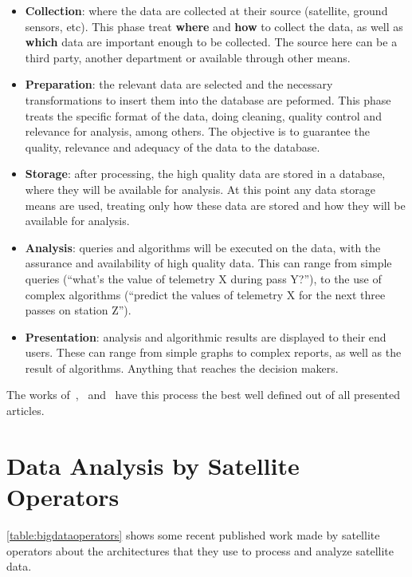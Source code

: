 \begin{itemize}[noitemsep]
  \item \textbf{Collection}: where the data are collected at their source (satellite, ground sensors, etc).
    This phase treat \textbf{where} and \textbf{how} to collect the data, as well as \textbf{which} data are important enough to be collected.
    The source here can be a third party, another department or available through other means.
  \item \textbf{Preparation}: the relevant data are selected and the necessary transformations to insert them into the database are peformed.
    This phase treats the specific format of the data, doing cleaning, quality control and relevance for analysis, among others.
    The objective is to guarantee the quality, relevance and adequacy of the data to the database.
  \item \textbf{Storage}: after processing, the high quality data are stored in a database, where they will be available for analysis.
    At this point any data storage means are used, treating only how these data are stored and how they will be available for analysis.
  \item \textbf{Analysis}: queries and algorithms will be executed on the data, with the assurance and availability of high quality data.
    This can range from simple queries (``what's the value of telemetry X during pass Y?''), to the use of complex algorithms (``predict the values of telemetry X for the next three passes on station Z'').
  \item \textbf{Presentation}: analysis and algorithmic results are displayed to their end users.
    These can range from simple graphs to complex reports, as well as the result of algorithms. Anything that reaches the decision makers.
\end{itemize}

The works of~,~ and~ have this process the best well defined out of all presented articles.

\section{Data Analysis by Satellite Operators}\label{ch:corr:ops}

\autoref{table:bigdataoperators} shows some recent published work made by satellite operators about the architectures that they use to process and analyze satellite data.

